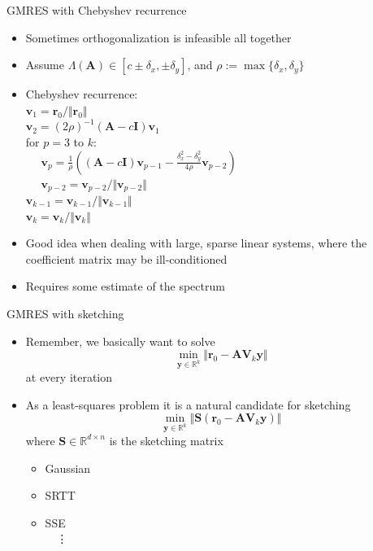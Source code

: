 \documentclass{beamer}
\newcommand{\bvec}[1]{\mathbf{#1}}
\newcommand{\vr}{\bvec{r}}
\newcommand{\vv}{\bvec{v}}
\newcommand{\vy}{\bvec{y}}
\newcommand{\vA}{\bvec{A}}
\newcommand{\vI}{\bvec{I}}
\newcommand{\vS}{\bvec{S}}
\newcommand{\vV}{\bvec{V}}
\newcommand{\bitem}{\item[$\bullet$]}
\begin{document}
\begin{frame}{GMRES with Chebyshev recurrence}

\begin{itemize}
    \bitem Sometimes orthogonalization is infeasible all together
    \bitem Assume $\Lambda(\vA) \in [c\pm \delta_x, \pm \delta_y]$, and $\rho := \max \{ \delta_x, \delta_y\}$
    \bitem Chebyshev recurrence:\\
    $\vv_1 = \vr_0/\Vert \vr_0\Vert$\\
    $\vv_2 = (2\rho)^{-1} (\vA -c\vI) \vv_1$\\
    for $p = 3$ to $k$:\\
    $\quad$ $\vv_p = \frac{1}{\rho} \left( (\vA - c\vI)\vv_{p-1} - \frac{\delta_x^2 - \delta_y^2}{4\rho}\vv_{p-2} \right)$\\
    $\quad$ $\vv_{p-2} = \vv_{p-2}/\Vert \vv_{p-2} \Vert$\\
    $\vv_{k-1} = \vv_{k-1}/\Vert \vv_{k-1} \Vert$\\
    $\vv_{k} = \vv_{k}/\Vert \vv_{k} \Vert$
    \bitem Good idea when dealing with large, sparse linear systems, where the coefficient matrix may be ill-conditioned
    \bitem Requires some estimate of the spectrum
\end{itemize}
    
\end{frame}


\begin{frame}{GMRES with sketching}

\begin{itemize}
    \bitem Remember, we basically want to solve
    $$
    \min_{\vy \in \mathbb{R}^k} \Vert \vr_0 - \vA \vV_k \vy\Vert 
    $$
    at every iteration
    \bitem As a least-squares problem it is a natural candidate for sketching
    $$
    \min_{\vy \in \mathbb{R}^k} \Vert \vS(\vr_0 - \vA \vV_k \vy)\Vert 
    $$
    where $\vS \in\mathbb{R}^{d\times n}$ is the sketching matrix
    \begin{itemize}
        \bitem Gaussian
        \bitem SRTT
        \bitem SSE\\
        ~~\vdots
    \end{itemize}
\end{itemize}
    
\end{frame}
\end{document}
